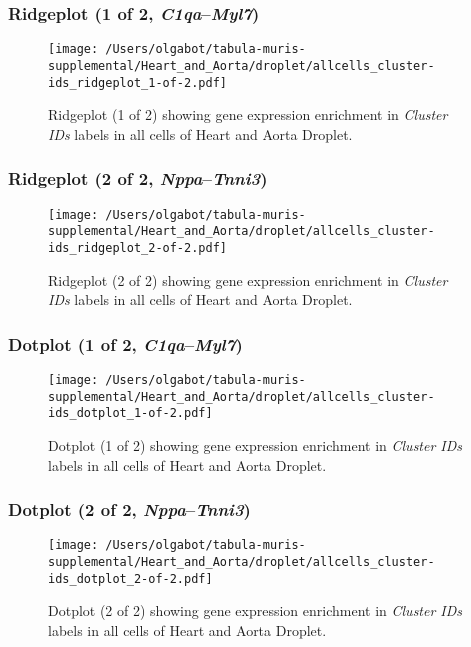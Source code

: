 \clearpage

\subsubsection{Ridgeplot (1 of 2, \emph{C1qa}--\emph{Myl7})}
\begin{figure}[h]
\centering
\texttt{[image: /Users/olgabot/tabula-muris-supplemental/Heart\_and\_Aorta/droplet/allcells\_cluster-ids\_ridgeplot\_1-of-2.pdf]}

\caption{ Ridgeplot (1 of 2)  showing gene expression enrichment in \emph{Cluster IDs} labels in all cells of Heart and Aorta Droplet. }
\end{figure}


\clearpage

\subsubsection{Ridgeplot (2 of 2, \emph{Nppa}--\emph{Tnni3})}
\begin{figure}[h]
\centering
\texttt{[image: /Users/olgabot/tabula-muris-supplemental/Heart\_and\_Aorta/droplet/allcells\_cluster-ids\_ridgeplot\_2-of-2.pdf]}

\caption{ Ridgeplot (2 of 2)  showing gene expression enrichment in \emph{Cluster IDs} labels in all cells of Heart and Aorta Droplet. }
\end{figure}


\clearpage

\subsubsection{Dotplot (1 of 2, \emph{C1qa}--\emph{Myl7})}
\begin{figure}[h]
\centering
\texttt{[image: /Users/olgabot/tabula-muris-supplemental/Heart\_and\_Aorta/droplet/allcells\_cluster-ids\_dotplot\_1-of-2.pdf]}

\caption{ Dotplot (1 of 2)  showing gene expression enrichment in \emph{Cluster IDs} labels in all cells of Heart and Aorta Droplet. }
\end{figure}


\clearpage

\subsubsection{Dotplot (2 of 2, \emph{Nppa}--\emph{Tnni3})}
\begin{figure}[h]
\centering
\texttt{[image: /Users/olgabot/tabula-muris-supplemental/Heart\_and\_Aorta/droplet/allcells\_cluster-ids\_dotplot\_2-of-2.pdf]}

\caption{ Dotplot (2 of 2)  showing gene expression enrichment in \emph{Cluster IDs} labels in all cells of Heart and Aorta Droplet. }
\end{figure}


